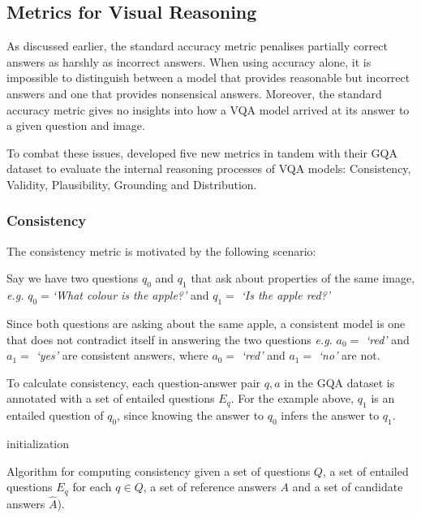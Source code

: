 \subsection{Metrics for Visual Reasoning}

As discussed earlier, the standard accuracy metric penalises partially correct answers as harshly as incorrect answers. When using accuracy alone, it is impossible to distinguish between a model that provides reasonable but incorrect answers and one that provides nonsensical answers. Moreover, the standard accuracy metric gives no insights into how a VQA model arrived at its answer to a given question and image.

To combat these issues, \citeauthor{hudson2019gqa} developed five new metrics in tandem with their GQA dataset \cite{hudson2019gqa} to evaluate the internal reasoning processes of VQA models: Consistency, Validity, Plausibility, Grounding and Distribution.

\subsubsection{Consistency}

The consistency metric is motivated by the following scenario:

Say we have two questions \(q_0\) and \(q_1\) that ask about properties of the same image, \textit{e.g.} \(q_0 = \)\textit{`What colour is the apple?'} and  \(q_1 = \) \textit{`Is the apple red?'}

Since both questions are asking about the same apple, a consistent model is one that does not contradict itself in answering the two questions \textit{e.g.} \(a_0 =\) \textit{`red'} and \(a_1 =\) \textit{`yes'} are consistent answers, where \(a_0 =\) \textit{`red'} and \(a_1 =\) \textit{`no'} are not.

To calculate consistency, each question-answer pair \(q, a\) in the GQA dataset is annotated with a set of entailed questions \(E_q\). For the example above, \(q_1\) is an entailed question of \(q_0\), since knowing the answer to \(q_0\) infers the answer to \(q_1\).

\begin{algorithm}[htbp]
 initialization\;
 \caption{Algorithm for computing consistency given a set of questions \(Q\), a set of entailed questions \(E_q\) for each \(q \in Q\), a set of reference answers \(A\) and a set of candidate answers \(\hat{A}\)).}
\end{algorithm}



